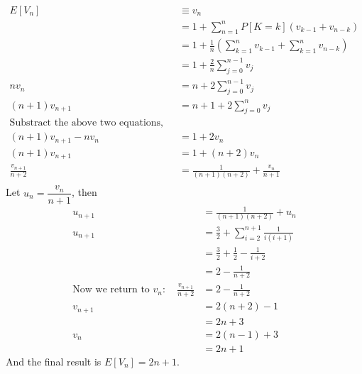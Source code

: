 \documentclass{article}
\begin{document}
\begin{align*}
E[V_n]&\equiv v_n \\
&=1+\sum_{n=1}^nP[K=k](v_{k-1}+v_{n-k}) \\
&=1+\frac{1}{n}(\sum_{k=1}^nv_{k-1}+\sum_{k=1}^nv_{n-k})\\
&=1+\frac{2}{n}\sum_{j=0}^{n-1}v_j \\
nv_n&=n+2\sum_{j=0}^{n-1}v_j \\
(n+1)v_{n+1}&=n+1+2\sum_{j=0}^nv_j \\[-2.5ex]
\text{Substract the above two equations, we get:}\\
(n+1)v_{n+1}-nv_n&=1+2v_n\\
(n+1)v_{n+1}&=1+(n+2)v_n \\
\frac{v_{n+1}}{n+2}&=\frac{1}{(n+1)(n+2)}+\frac{v_n}{n+1} \\
\end{align*}
Let $u_n=\dfrac{v_n}{n+1}$, then\\  %
\begin{align*}
u_{n+1}&=\frac{1}{(n+1)(n+2)}+u_n \\
u_{n+1}&=\frac{3}{2}+\sum_{i=2}^{n+1}\frac{1}{i(i+1)} \\
&=\frac{3}{2}+\frac{1}{2}-\frac{1}{i+2} \\
&=2-\frac{1}{n+2}\\
\text{Now we return to } v_n:\quad \frac{v_{n+1}}{n+2}&=2-\frac{1}{n+2}\\
v_{n+1}&=2(n+2)-1\\
&=2n+3\\
v_n&=2(n-1)+3\\
&=2n+1
\end{align*}
And the final result is $E[V_n]=2n+1.$
\end{document}
